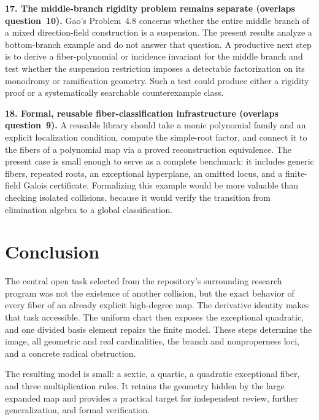 \documentclass[11pt,a4paper]{article}
\theoremstyle{definition}
\begin{document}
\textbf{17. The middle-branch rigidity problem remains separate (overlaps
question~10).} Gao's Problem~4.8 concerns whether the entire middle branch of
a mixed direction-field construction is a suspension. The present results
analyze a bottom-branch example and do not answer that question. A
productive next step is to derive a fiber-polynomial or incidence invariant
for the middle branch and test whether the suspension restriction imposes a
detectable factorization on its monodromy or ramification geometry. Such a
test could produce either a rigidity proof or a systematically searchable
counterexample class.

\textbf{18. Formal, reusable fiber-classification infrastructure (overlaps
question~9).} A reusable library should take a monic polynomial family and
an explicit localization condition, compute the simple-root factor, and
connect it to the fibers of a polynomial map via a proved reconstruction
equivalence. The present case is small enough to serve as a complete
benchmark: it includes generic fibers, repeated roots, an exceptional
hyperplane, an omitted locus, and a finite-field Galois certificate.
Formalizing this example would be more valuable than checking isolated
collisions, because it would verify the transition from elimination algebra
to a global classification.

\section{Conclusion}
\label{f6:sec:conclusion}
The central open task selected from the repository's surrounding research
program was not the existence of another collision, but the exact
behavior of every fiber of an already explicit high-degree map.
The derivative identity makes that task accessible. The uniform chart
then exposes the exceptional quadratic, and one divided basis element
repairs the finite model. These steps determine the image, all geometric
and real cardinalities, the branch and nonproperness loci, and a concrete
radical obstruction.

The resulting model is small: a sextic, a quartic, a quadratic exceptional
fiber, and three multiplication rules. It retains the geometry hidden by
the large expanded map and provides a practical target for independent
review, further generalization, and formal verification.
\end{document}
